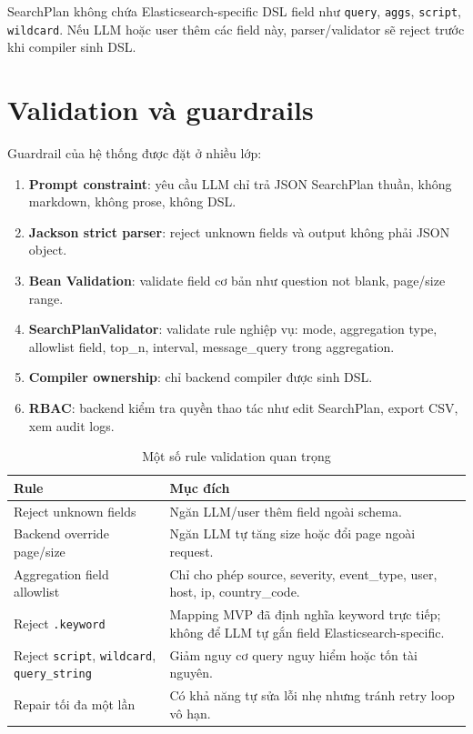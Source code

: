 \documentclass[12pt,a4paper]{report}
\begin{document}
SearchPlan không chứa Elasticsearch-specific DSL field như \texttt{query}, \texttt{aggs}, \texttt{script}, \texttt{wildcard}. Nếu LLM hoặc user thêm các field này, parser/validator sẽ reject trước khi compiler sinh DSL.

\section{Validation và guardrails}

Guardrail của hệ thống được đặt ở nhiều lớp:

\begin{enumerate}
    \item \textbf{Prompt constraint}: yêu cầu LLM chỉ trả JSON SearchPlan thuần, không markdown, không prose, không DSL.
    \item \textbf{Jackson strict parser}: reject unknown fields và output không phải JSON object.
    \item \textbf{Bean Validation}: validate field cơ bản như question not blank, page/size range.
    \item \textbf{SearchPlanValidator}: validate rule nghiệp vụ: mode, aggregation type, allowlist field, top\_n, interval, message\_query trong aggregation.
    \item \textbf{Compiler ownership}: chỉ backend compiler được sinh DSL.
    \item \textbf{RBAC}: backend kiểm tra quyền thao tác như edit SearchPlan, export CSV, xem audit logs.
\end{enumerate}

\begin{table}[H]
\centering
\caption{Một số rule validation quan trọng}
\begin{tabularx}{\textwidth}{p{4.2cm}Y}
\toprule
\textbf{Rule} & \textbf{Mục đích} \\
\midrule
Reject unknown fields & Ngăn LLM/user thêm field ngoài schema. \\
Backend override page/size & Ngăn LLM tự tăng size hoặc đổi page ngoài request. \\
Aggregation field allowlist & Chỉ cho phép source, severity, event\_type, user, host, ip, country\_code. \\
Reject \texttt{.keyword} & Mapping MVP đã định nghĩa keyword trực tiếp; không để LLM tự gắn field Elasticsearch-specific. \\
Reject \texttt{script}, \texttt{wildcard}, \texttt{query\_string} & Giảm nguy cơ query nguy hiểm hoặc tốn tài nguyên. \\
Repair tối đa một lần & Có khả năng tự sửa lỗi nhẹ nhưng tránh retry loop vô hạn. \\
\bottomrule
\end{tabularx}
\end{table}
\end{document}
